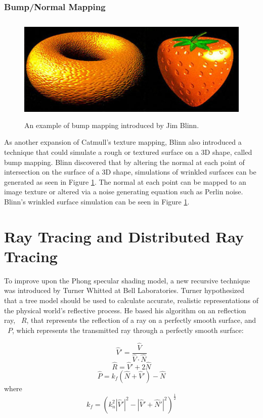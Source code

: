 \subsubsection{Bump/Normal Mapping}
\label{subsubsec:BNMap}
\begin{figure}[h]
\centering
\includegraphics[height=2.0in]{figures/blinn_bump.jpg}
\caption{An example of bump mapping introduced by Jim Blinn. \cite{blinn1978simulation}}
\label{fig:bumpmap}
\end{figure}
As another expansion of Catmull's texture mapping, Blinn also introduced a technique that could simulate a rough or textured surface on a 3D shape, called bump mapping\cite{blinn1976texture}. Blinn discovered that by altering the normal at each point of intersection on the surface of a 3D shape, simulations of wrinkled surfaces can be generated as seen in Figure \ref{fig:bumpmap}.  The normal at each point can be mapped to an image texture or altered via a noise generating equation such as Perlin noise.  Blinn's wrinkled surface simulation can be seen in Figure \ref{fig:bumpmap}.
\section{Ray Tracing and Distributed Ray Tracing}
To improve upon the Phong specular shading model, a new recursive technique was introduced by Turner Whitted at Bell Laboratories.  Turner hypothesized that a tree model should be used to calculate accurate, realistic representations of the physical world's reflective process.  He based his algorithm on an reflection ray, ~$R$, that represents the reflection of a ray on a perfectly smooth surface, and ~$P$, which represents the transmitted ray through a perfectly smooth surface:

\begin{equation}
\label{eq:raytracing1}
\hat{V}' = \frac{\hat{V}}{\hat{V} \cdot \hat{N}}
\end{equation}
\begin{equation}
\label{eq:raytracing2}
\hat{R} = \hat{V}' + 2\hat{N}
\end{equation}
\begin{equation}
\label{eq:raytracing3}
\hat{P} = k_{f}(\hat{N} + \hat{V}') - \hat{N}
\end{equation}
where
\begin{equation}
\label{eq:raytracing4}
k_{f} = (k_{n}^{2}|\hat{V}'|^{2} - |\hat{V}' + \hat{N}'|^2)^{\frac{1}{2}}
\end{equation}

